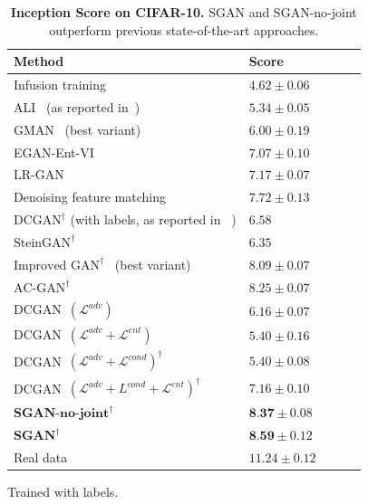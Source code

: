 \documentclass[10pt,twocolumn,letterpaper]{article}
\begin{document}
\begin{table}[!tbp]
\centering
\begin{threeparttable}
\renewcommand{\arraystretch}{1.2}
\begin{tabular}{lllll}
\hline
Method          		& Score \\ \hline
Infusion training~\cite{bordes2017learning} & $4.62\pm 0.06$ \\ 
ALI~\cite{dumoulin2017adversarially} (as reported in~\cite{david2017improving}) 				& $5.34\pm 0.05$ \\ 
GMAN~\cite{durugkar2017gman} (best variant)	& $6.00\pm 0.19$ \\ 
EGAN-Ent-VI~\cite{dai2017calibrating} 					& $7.07\pm 0.10$ \\
LR-GAN~\cite{yang2017lrgan}	& $7.17\pm 0.07$ \\ 
Denoising feature matching~\cite{david2017improving} 					& $7.72\pm 0.13$ \\ \hline
$\text{DCGAN}^{\dag}$ (with labels, as reported in ~\cite{wang2017learning}) 		& $6.58$ \\ 
$\text{SteinGAN}^{\dag}$~\cite{wang2017learning} 		& $6.35$ \\ 
$\text{Improved GAN}^{\dag}$~\cite{salimans2016improved} (best variant)	& $8.09\pm 0.07$ \\ 
$\text{AC-GAN}^{\dag}$~\cite{odena2017conditional}			& $8.25\pm 0.07$ \\ \hline
DCGAN~$(\mathcal{L}^{adv})$	& $6.16\pm 0.07$ \\ 
DCGAN~$(\mathcal{L}^{adv}+\mathcal{L}^{ent})$	& $5.40\pm 0.16$ \\ 
DCGAN~$(\mathcal{L}^{adv}+\mathcal{L}^{cond})^{\dag}$	& $5.40\pm 0.08$ \\ 
DCGAN~$(\mathcal{L}^{adv}+L^{cond}+\mathcal{L}^{ent})^{\dag}$			& $7.16\pm 0.10$ \\ 
$\textbf{SGAN-no-joint}^{\dag}$	& $\textbf{8.37} \pm 0.08$ \\
$\textbf{SGAN}^{\dag}$		& $\textbf{8.59} \pm 0.12$ \\ \hline
Real data 				& $11.24\pm 0.12$ \\ 
\end{tabular}
\begin{tablenotes}
\item [\dag] Trained with labels.
\end{tablenotes}
\caption{\textbf{Inception Score on CIFAR-10.} SGAN and SGAN-no-joint outperform previous state-of-the-art approaches.}\label{tab:inception}
\end{threeparttable}
\vspace{-0.2cm}
\end{table}
\end{document}
